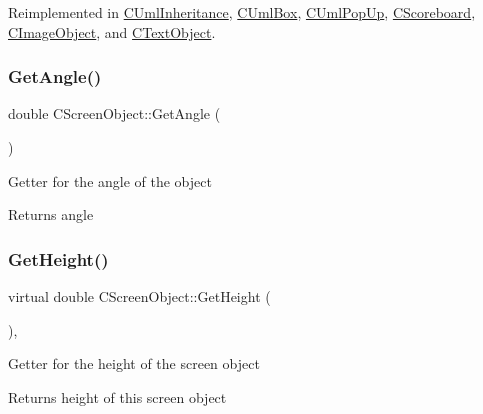 Reimplemented in \mbox{\hyperlink{class_c_uml_inheritance_a57c02d5be17880c29a3573ead25ecc36}{C\+Uml\+Inheritance}}, \mbox{\hyperlink{class_c_uml_box_a9f4f8ae512bae9039279a62923435846}{C\+Uml\+Box}}, \mbox{\hyperlink{class_c_uml_pop_up_ab9dc4616dc8b7529a69d74a9db83b3a9}{C\+Uml\+Pop\+Up}}, \mbox{\hyperlink{class_c_scoreboard_a43f1b32f96b09b649b9052b97da81d4b}{C\+Scoreboard}}, \mbox{\hyperlink{class_c_image_object_a7f550785caf6f15a5a521ee69acc03c4}{C\+Image\+Object}}, and \mbox{\hyperlink{class_c_text_object_a467038e52d2e587083526cc42a76131f}{C\+Text\+Object}}.

\mbox{\label{class_c_screen_object_ad7450c849f4b4f4f6d66c5acbcaa330c}} 
\subsubsection{\texorpdfstring{GetAngle()}{GetAngle()}}
{\footnotesize\ttfamily double C\+Screen\+Object\+::\+Get\+Angle (\begin{DoxyParamCaption}{ }\end{DoxyParamCaption})\hspace{0.3cm}{\ttfamily [inline]}}

Getter for the angle of the object \begin{DoxyReturn}{Returns}
angle 
\end{DoxyReturn}
\mbox{\label{class_c_screen_object_a5951174e223dbfe0fe9ed264905130a9}} 
\subsubsection{\texorpdfstring{GetHeight()}{GetHeight()}}
{\footnotesize\ttfamily virtual double C\+Screen\+Object\+::\+Get\+Height (\begin{DoxyParamCaption}{ }\end{DoxyParamCaption})\hspace{0.3cm}{\ttfamily [inline]}, {\ttfamily [virtual]}}

Getter for the height of the screen object \begin{DoxyReturn}{Returns}
height of this screen object 
\end{DoxyReturn}


